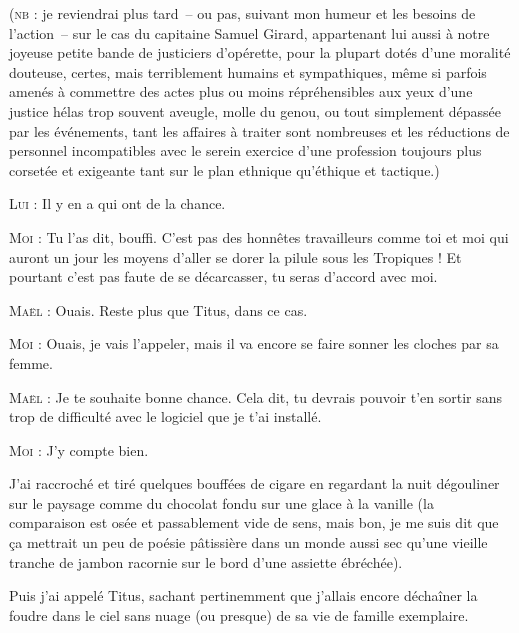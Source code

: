 (\textsc{nb} : je reviendrai plus tard~-- ou pas, suivant mon humeur et les besoins de l’action~-- sur le cas du capitaine Samuel Girard, appartenant lui aussi à notre joyeuse petite bande de justiciers d’opérette, pour la plupart dotés d’une moralité douteuse, certes, mais terriblement humains et sympathiques, même si parfois amenés à commettre des actes plus ou moins répréhensibles aux yeux d’une justice hélas trop souvent aveugle, molle du genou, ou tout simplement dépassée par les événements, tant les affaires à traiter sont nombreuses et les réductions de personnel incompatibles avec le serein exercice d’une profession toujours plus corsetée et exigeante tant sur le plan ethnique qu’éthique et tactique.)

\begin{dialogue}

\textsc{Lui} : Il y en a qui ont de la chance.

\textsc{Moi} : Tu l’as dit, bouffi. C’est pas des honnêtes travailleurs comme toi et moi qui auront un jour les moyens d’aller se dorer la pilule sous les Tropiques ! Et pourtant c’est pas faute de se décarcasser, tu seras d’accord avec moi.

\textsc{Maël} : Ouais. Reste plus que Titus, dans ce cas.

\textsc{Moi} : Ouais, je vais l’appeler, mais il va encore se faire sonner les cloches par sa femme.

\textsc{Maël} : Je te souhaite bonne chance. Cela dit, tu devrais pouvoir t’en sortir sans trop de difficulté avec le logiciel que je t’ai installé.

\textsc{Moi} : J’y compte bien.

\end{dialogue}

J’ai raccroché et tiré quelques bouffées de cigare en regardant la nuit dégouliner sur le paysage comme du chocolat fondu sur une glace à la vanille (la comparaison est osée et passablement vide de sens, mais bon, je me suis dit que ça mettrait un peu de poésie pâtissière dans un monde aussi sec qu’une vieille tranche de jambon racornie sur le bord d’une assiette ébréchée).

Puis j’ai appelé Titus, sachant pertinemment que j’allais encore déchaîner la foudre dans le ciel sans nuage (ou presque) de sa vie de famille exemplaire.

